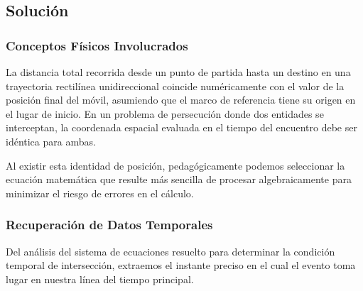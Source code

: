 \documentclass[12pt, a4paper]{article}
\begin{document}
\begin{center}
\end{center}

\subsection*{Solución}

\subsubsection*{Conceptos Físicos Involucrados}

La distancia total recorrida desde un punto de partida hasta un destino en una trayectoria rectilínea unidireccional coincide numéricamente con el valor de la posición final del móvil, asumiendo que el marco de referencia tiene su origen en el lugar de inicio. En un problema de persecución donde dos entidades se interceptan, la coordenada espacial evaluada en el tiempo del encuentro debe ser idéntica para ambas.

Al existir esta identidad de posición, pedagógicamente podemos seleccionar la ecuación matemática que resulte más sencilla de procesar algebraicamente para minimizar el riesgo de errores en el cálculo.

\subsubsection*{Recuperación de Datos Temporales}

Del análisis del sistema de ecuaciones resuelto para determinar la condición temporal de intersección, extraemos el instante preciso en el cual el evento toma lugar en nuestra línea del tiempo principal.
\end{document}
